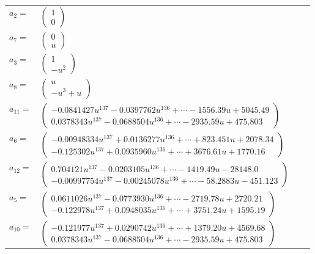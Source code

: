 \documentclass[1p]{elsarticle_modified}
\theoremstyle{definition}
\begin{document}
\begin{tabular}{m{7pt} m{180pt} m{7pt} m{180pt} }
\flushright $a_{2}=$&$\begin{pmatrix}1\\0\end{pmatrix}$ \\
\flushright $a_{7}=$&$\begin{pmatrix}0\\u\end{pmatrix}$ \\
\flushright $a_{3}=$&$\begin{pmatrix}1\\- u^2\end{pmatrix}$ \\
\flushright $a_{8}=$&$\begin{pmatrix}u\\- u^3+u\end{pmatrix}$ \\
\flushright $a_{11}=$&$\begin{pmatrix}-0.0841427 u^{137}-0.0397762 u^{136}+\cdots-1556.39 u+5045.49\\0.0378343 u^{137}-0.0688504 u^{136}+\cdots-2935.59 u+475.803\end{pmatrix}$ \\
\flushright $a_{6}=$&$\begin{pmatrix}-0.00948334 u^{137}+0.0136277 u^{136}+\cdots+823.451 u+2078.34\\-0.125302 u^{137}+0.0935960 u^{136}+\cdots+3676.61 u+1770.16\end{pmatrix}$ \\
\flushright $a_{12}=$&$\begin{pmatrix}0.704121 u^{137}-0.0203105 u^{136}+\cdots-1419.49 u-28148.0\\-0.00997754 u^{137}-0.00245078 u^{136}+\cdots-58.2883 u-451.123\end{pmatrix}$ \\
\flushright $a_{5}=$&$\begin{pmatrix}0.0611026 u^{137}-0.0773930 u^{136}+\cdots-2719.78 u+2720.21\\-0.122978 u^{137}+0.0948035 u^{136}+\cdots+3751.24 u+1595.19\end{pmatrix}$ \\
\flushright $a_{10}=$&$\begin{pmatrix}-0.121977 u^{137}+0.0290742 u^{136}+\cdots+1379.20 u+4569.68\\0.0378343 u^{137}-0.0688504 u^{136}+\cdots-2935.59 u+475.803\end{pmatrix}$ \\

\end{tabular}
\end{document}
